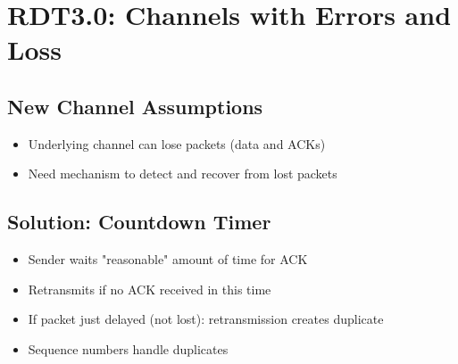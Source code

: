\documentclass[12pt]{article}
\begin{document}
\section{RDT3.0: Channels with Errors and Loss}

\subsection{New Channel Assumptions}
\begin{itemize}
    \item Underlying channel can lose packets (data and ACKs)
    \item Need mechanism to detect and recover from lost packets
\end{itemize}

\subsection{Solution: Countdown Timer}
\begin{itemize}
    \item Sender waits "reasonable" amount of time for ACK
    \item Retransmits if no ACK received in this time
    \item If packet just delayed (not lost): retransmission creates duplicate
    \item Sequence numbers handle duplicates
\end{itemize}
\end{document}
